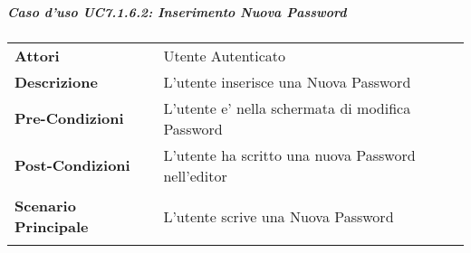 \subparagraph{Caso d'uso UC7.1.6.2:  Inserimento Nuova Password}
\label{UC7_1_6_2}

\begin{tabular}{ l | p{11cm}}
	\hline
	\rowcolor{Gray}
	 \multicolumn{2}{c}{UC7.1.6.2 - Inserimento Nuova Password} \\
	 \hline
	\textbf{Attori} & Utente Autenticato \\
	\textbf{Descrizione} & L'utente inserisce una Nuova Password\\
	\textbf{Pre-Condizioni} & L'utente e' nella schermata di modifica Password\\
	\textbf{Post-Condizioni} & L'utente ha scritto una nuova Password nell'editor\\
	\textbf{Scenario Principale} & 
	\begin{enumerate*}[label=(\arabic*.),itemjoin={\newline}]
		\item L'utente scrive una Nuova Password
	\end{enumerate*}\\
\end{tabular}